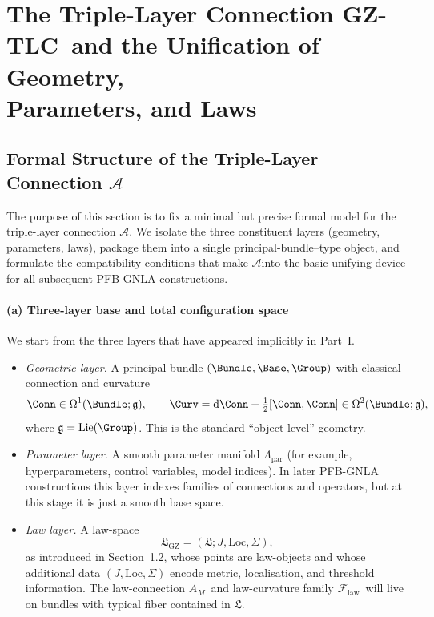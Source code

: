 \documentclass[11pt]{book}
\theoremstyle{plain}
\theoremstyle{definition}
\newcommand{\GZLS}{\ensuremath{\mathfrak{L}_{\mathrm{GZ}}}}       \newcommand{\GZLT}{\ensuremath{M_{!w}}}                           \newcommand{\GZLOC}{\ensuremath{A_M}}                             \newcommand{\GZLCurv}{\ensuremath{\mathcal{F}_{\mathrm{law}}}}
\newcommand{\GZTLCtxt}{\textsf{GZ-TLC}}                           \newcommand{\GZTLC}{\ensuremath{\mathcal{A}}}                     \newcommand{\GZGMS}{\textsf{GZ-GMS}}
\begin{document}
\chapter[Triple-Layer Connection \GZTLCtxt]{The Triple-Layer Connection \GZTLCtxt \  and the Unification of Geometry,\\
         Parameters, and Laws}


\section{Formal Structure of the Triple-Layer Connection \GZTLC}


The purpose of this section is to fix a minimal but precise formal model
for the triple-layer connection \GZTLC. We isolate the three constituent
layers (geometry, parameters, laws), package them into a single
principal-bundle–type object, and formulate the compatibility
conditions that make \GZTLC into the basic unifying device for all
subsequent PFB-GNLA constructions.



\subsubsection*{(a) Three-layer base and total configuration space}

We start from the three layers that have appeared implicitly in
Part~I.

\begin{itemize}
  \item \emph{Geometric layer.}
        A principal bundle $(\Bundle,\Base,\Group)$ with classical
        connection and curvature
        \[
           \Conn\in\Omega^1(\Bundle;\mathfrak{g}),\qquad
           \Curv = \mathrm{d}\Conn + \tfrac12[\Conn,\Conn]
           \in\Omega^2(\Bundle;\mathfrak{g}),
        \]
        where $\mathfrak{g}=\mathrm{Lie}(\Group)$.
        This is the standard “object-level” geometry.
  \item \emph{Parameter layer.}
        A smooth parameter manifold $\Lambda_{\mathrm{par}}$ (for
        example, hyperparameters, control variables, model indices).
        In later PFB-GNLA constructions this layer indexes families of
        connections and operators, but at this stage it is just a
        smooth base space.
  \item \emph{Law layer.}
        A law-space
        \[
          \GZLS=(\mathfrak{L};J,\mathrm{Loc},\Sigma),
        \]
        as introduced in Section~1.2, whose points are law-objects and
        whose additional data $(J,\mathrm{Loc},\Sigma)$ encode metric,
        localisation, and threshold information. The law-connection
        \GZLOC\ and law-curvature family \GZLCurv\ will live on bundles
        with typical fiber contained in $\mathfrak{L}$.
\end{itemize}
\end{document}
